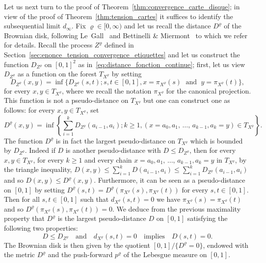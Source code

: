 \documentclass[AHL,Unicode,longabstracts,published]{cedram}
\newcommand{\1}{\ensembles{1}}
\renewcommand{\le}{\leqslant}
\renewcommand{\ge}{\geqslant}
\newcommand{\dBmap}{D}
\newcommand{\pBmap}{p}
\newcommand{\CRT}{T}
\newcommand{\dCRT}{d}
\begin{document}
Let us next turn to the proof of Theorem~\ref{thm:convergence_carte_disque}; in view of the proof of Theorem~\ref{thm:tension_cartes} it suffices to identify the subsequential limit $d_\infty$. Fix $\varrho \in [0, \infty)$ and let us recall the distance $\dBmap^\varrho$ of the Brownian disk, following Le~Gall~\cite{LG07} and Bettinelli \& Miermont~\cite{BM17} to which we refer for details. Recall the process $Z^\varrho$ defined in Section~\ref{sec:enonce_tension_convergence_etiquettes} and let us construct the function $D_{Z^\varrho}$ on $[0,1]^2$ as in~\eqref{eq:distance_fonction_continue}; first, let us view $D_{Z^\varrho}$ as a function on the forest $\CRT_{X^\varrho}$ by setting
\[
D_{Z^\varrho}(x,y) = \inf\big\{D_{Z^\varrho}(s,t) ; s,t \in [0,1], x=\pi_{X^\varrho}(s)\;\text{ and }\; y=\pi_{X^\varrho}(t)\big\},
\]
for every $x, y \in \CRT_{X^\varrho}$, where we recall the notation $\pi_{X^\varrho}$ for the canonical projection. This function is not a pseudo-distance on $\CRT_{X^\varrho}$ but one can construct one as follows: for every $x, y \in \CRT_{X^\varrho}$, set
\[
\dBmap^\varrho(x,y) = \inf\left\{\sum_{i=1}^k D_{Z^\varrho}(a_{i-1}, a_i) ; k \ge 1, \left(x=a_0, a_1,\,\dots,\, a_{k-1}, a_k=y\right) \in \CRT_{X^\varrho}\right\}.
\]
The function $\dBmap^\varrho$ is in fact the largest pseudo-distance on $\CRT_{X^\varrho}$ which is bounded by $D_{Z^\varrho}$. Indeed if $D$ is another pseudo-distance with $D \le D_{Z^\varrho}$, then for every $x,y \in \CRT_{X^\varrho}$, for every $k \ge 1$ and every chain $x=a_0, a_1,\,\dots,\,a_{k-1}, a_k=y$ in $\CRT_{X^\varrho}$, by the triangle inequality, $D(x, y) \le \sum_{i=1}^k D(a_{i-1}, a_i) \le \sum_{i=1}^k D_{Z^\varrho}(a_{i-1}, a_i)$ and so $D(x, y) \le \dBmap^\varrho(x, y)$. Furthermore, it can be seen as a pseudo-distance on $[0,1]$ by setting $\dBmap^\varrho(s,t) = \dBmap^\varrho(\pi_{X^\varrho}(s),\pi_{X^\varrho}(t))$ for every $s,t \in [0,1]$. Then for all $s,t \in [0,1]$ such that $\dCRT_{X^\varrho}(s,t) = 0$ we have $\pi_{X^\varrho}(s) = \pi_{X^\varrho}(t)$ and so $\dBmap^\varrho(\pi_{X^\varrho}(s),\pi_{X^\varrho}(t)) = 0$. We deduce from the previous maximality property that $\dBmap^\varrho$ is the largest pseudo-distance $D$ on $[0,1]$ satisfying the following two properties:
\[
D \le D_{Z^\varrho}
\quad\text{and}\quad
\dCRT_{X^\varrho}(s,t) = 0 \quad\text{implies}\quad D(s,t) = 0.
\]
The Brownian disk is then given by the quotient $[0,1] / \{\dBmap^\varrho=0\}$, endowed with the metric $\dBmap^\varrho$ and the push-forward $\pBmap^\varrho$ of the Lebesgue measure on $[0,1]$.
\end{document}
